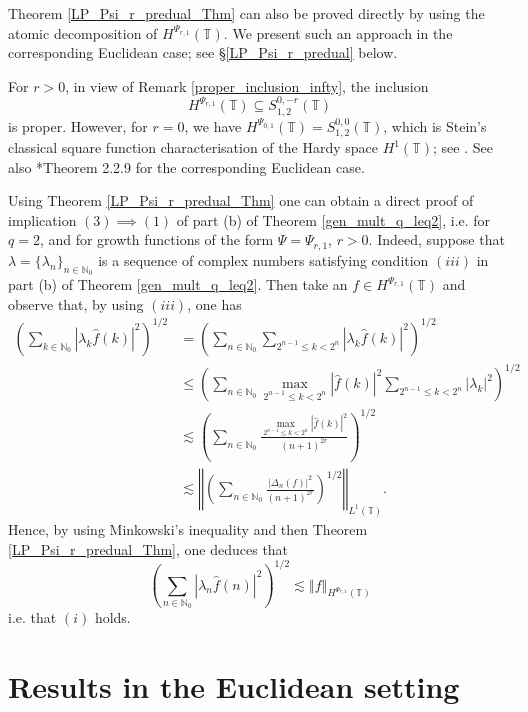 \documentclass[a4paper, leqno, 10pt]{amsart}
\numberwithin{equation}{section}
\newcommand{\T}{\mathbb{T}}
\newcommand{\norm}[1]{\left\Vert#1\right\Vert}
\newcommand{\N}{\mathbb{N}}
\begin{document}
Theorem \ref{LP_Psi_r_predual_Thm} can also be proved directly by using the atomic decomposition of  $H^{\Psi_{r,1}} (\T)$. We present such an approach in the corresponding Euclidean case; see \S \ref{LP_Psi_r_predual} below.

For $r >0$, in view of Remark \ref{proper_inclusion_infty}, the inclusion
\begin{equation}\label{inclusion_T-L_1}
H^{\Psi_{r,1}} (\T) \subseteq S^{0,-r}_{1,2} (\T)
\end{equation}
is proper. However, for $r=0$, we have $H^{\Psi_{0,1}} (\T) = S^{0,0}_{1,2} (\T)$, which is Stein's classical square function characterisation of the Hardy space $H^1 (\T)$; see  \cite{Stein_mult}. See also \cite{Grafakos_modern}*{Theorem 2.2.9} for the corresponding Euclidean case.

Using Theorem \ref{LP_Psi_r_predual_Thm} one can obtain a direct proof of implication $(3) \implies (1)$ of part (b) of Theorem \ref{gen_mult_q_leq2}, i.e. for $q=2$, and for growth functions of the form $\Psi= \Psi_{r,1}$, $r >0$. Indeed, suppose that  $ \lambda = \{ \lambda_n \}_{n \in \N_0}$ is a sequence of complex numbers satisfying condition $(iii)$ in part (b) of Theorem \ref{gen_mult_q_leq2}.  Then take an $f \in H^{\Psi_{r,1}} (\T)$ and observe that, by using $(iii)$, one has
\begin{align*}
\left( \sum_{k \in \N_0} | \lambda_k \widehat{f} (k) |^2 \right)^{1/2} & = \left( \sum_{n \in \N_0} \sum_{2^{n-1} \leq  k  < 2^n } | \lambda_k \widehat{f} (k) |^2 \right)^{1/2} \\
& \leq \left( \sum_{n \in \N_0}  \max_{2^{n-1} \leq k < 2^n} | \widehat{f} (k) |^2  \sum_{2^{n-1} \leq k < 2^n } | \lambda_k |^2 \right)^{1/2} \\
& \lesssim \left( \sum_{n \in \N_0} \frac{ \max_{2^{n-1} \leq k < 2^n} | \widehat{f} (k)|^2 }{(n+1)^{2r}}  \right)^{1/2} \\
&\lesssim \norm{\left( \sum_{n \in \N_0} \frac{ \left| \Delta_n (f) \right|^2}{\left( n +1 \right)^{2r}} \right)^{1/2}  }_{L^1 (\T)} .
\end{align*}
Hence, by using  Minkowski's inequality and then Theorem \ref{LP_Psi_r_predual_Thm}, one deduces that 
\[
\left( \sum_{n \in \N_0} | \lambda_n \widehat{f} (n) |^2 \right)^{1/2} \lesssim \norm{ f }_{H^{\Psi_{r,1}}(\T)}
\]
i.e. that $(i)$ holds.

\section{Results in the Euclidean setting}\label{eucl_proof}
%
\end{document}
